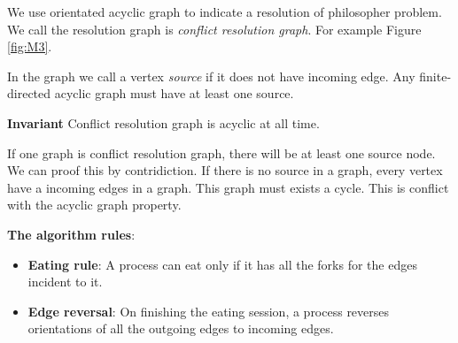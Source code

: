 \documentclass[twoside]{article}
\begin{document}
We use orientated acyclic graph to indicate a resolution of philosopher problem.
We call the resolution graph is {\it conflict resolution graph\/}. For example
Figure \ref{fig:M3}.

In the graph we call a vertex {\it source\/} if it does not have incoming edge.
Any finite-directed acyclic graph must have at least one source.

\textbf{Invariant} Conflict resolution graph is acyclic at all time.

If one graph is conflict resolution graph, there will be at least one source node.
We can proof this by contridiction. If there is no source in a graph, every vertex
have a incoming edges in a graph. This graph must exists a cycle. This is conflict
with the acyclic graph property.

\textbf{The algorithm rules}:

\begin{itemize}
\item \textbf{Eating rule}: A process can eat only if it has all the forks for the
edges incident to it.
\item \textbf{Edge reversal}: On finishing the eating session, a process reverses
orientations of all the outgoing edges to incoming edges.
\end{itemize}
\end{document}
